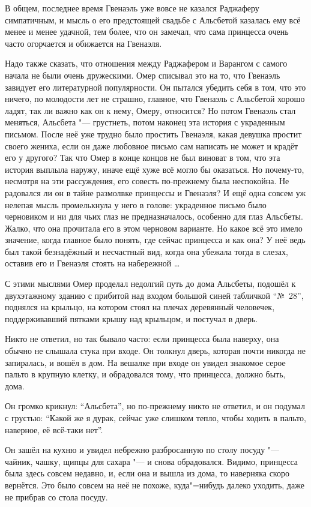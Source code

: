 В общем, последнее время Гвенаэль уже вовсе не казался Раджаферу симпатичным, и
мысль о его предстоящей свадьбе с Альсбетой казалась ему всё менее и менее
удачной, тем более, что он замечал, что сама принцесса очень часто огорчается и
обижается на Гвенаэля.

Надо также сказать, что отношения между Раджафером и Варангом с самого начала
не были очень дружескими.
Омер списывал это на то, что Гвенаэль завидует его литературной популярности.
Он пытался убедить себя в том, что это ничего, по молодости лет не страшно,
главное, что Гвенаэль с Альсбетой хорошо ладят, так ли важно как он к нему,
Омеру, относится?
Но потом Гвенаэль стал меняться, Альсбета "--- грустнеть, потом наконец эта
история с украденным письмом.
После неё уже трудно было простить Гвенаэля, какая девушка простит своего
жениха, если он даже любовное письмо сам написать не может и крадёт его у
другого?
Так что Омер в конце концов не был виноват в том, что эта история выплыла наружу,
иначе ещё хуже всё могло бы оказаться.
Но почему-то, несмотря на эти рассуждения, его совесть по-прежнему была
неспокойна.
Не радовался ли он в тайне размолвке принцессы и Гвенаэля?
И ещё одна совсем уж нелепая мысль промелькнула у него в голове: украденное
письмо было черновиком и ни для чьих глаз не предназначалось, особенно для глаз
Альсбеты.
Жалко, что она прочитала его в этом черновом варианте.
Но какое всё это имело значение, когда главное было понять, где сейчас принцесса
и как она?
У неё ведь был такой безнадёжный и несчастный вид, когда она убежала тогда в
слезах, оставив его и Гвенаэля стоять на набережной \ldots

С этими мыслями Омер проделал недолгий путь до дома Альсбеты, подошёл к
двухэтажному зданию с прибитой над входом большой синей табличкой \enquote{№~28},
поднялся на крыльцо, на котором стоял на плечах деревянный человечек,
поддерживавший пятками крышу над крыльцом, и постучал в дверь.

Никто не ответил, но так бывало часто: если принцесса была наверху, она обычно
не слышала стука при входе.
Он толкнул дверь, которая почти никогда не запиралась, и вошёл в дом.
На вешалке при входе он увидел знакомое серое пальто в крупную клетку, и
обрадовался тому, что принцесса, должно быть, дома.

Он громко крикнул: \enquote{Альсбета}, но по-прежнему никто не ответил, и он
подумал с грустью: \enquote{Какой же я дурак, сейчас уже слишком тепло, чтобы
ходить в пальто, наверное, её всё-таки нет}.

Он зашёл на кухню и увидел небрежно разбросанную по столу посуду "--- чайник,
чашку, щипцы для сахара "--- и снова обрадовался.
Видимо, принцесса была здесь совсем недавно, и, если она и вышла из дома, то
наверняка скоро вернётся.
Это было совсем на неё не похоже, куда"=нибудь далеко уходить, даже не прибрав
со стола посуду.

